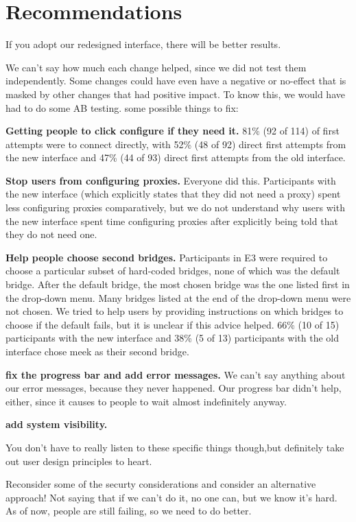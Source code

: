 \documentclass[USenglish,oneside,twocolumn]{article}
\begin{document}
\section{Recommendations}
\label{recommendations}
{\color {blue}
If you adopt our redesigned interface, there will be better results. 

We can't say how much each change helped, since we did not test them independently. Some changes could have even have a negative or no-effect that is masked by other changes that had positive impact. To know this, we would have had to do some AB testing. some possible things to fix: 

\begin{description}
\item {\bfseries Getting people to click configure if they need it.}  81\% (92 of 114) of first attempts were to connect directly, with 52\% (48 of 92) direct first attempts from the new interface and 47\% (44 of 93) direct first attempts from the old interface.  %
\item {\bfseries Stop users from configuring proxies.} Everyone did this. Participants with the new interface (which explicitly states that they did not need a proxy) spent less configuring proxies comparatively, but we do not understand why users with the new interface spent time configuring proxies after explicitly being told that they do not need one. %
\item {\bfseries Help people choose second bridges.}
Participants in E3 were required to choose a particular subset of hard-coded bridges, none of which was the default bridge. After the default bridge, the most chosen bridge was the one listed first in the drop-down menu. Many bridges listed at the end of the drop-down menu were not chosen. We tried to help users by providing instructions on which bridges to choose if the default fails, but it is unclear if this advice helped. 66\% (10 of 15) participants with the new interface and 38\% (5 of 13) participants with the old interface chose meek as their second bridge. %
\item {\bfseries fix the progress bar and add error messages.} 
We can't say anything about our error messages, because they never happened. Our progress bar didn't help, either, since it causes to people to wait almost indefinitely anyway. 
\item {\bfseries add system visibility.} 
\end{description}

You don't have to really listen to these specific things though,but definitely take out user design principles to heart. 

Reconsider some of the securty considerations and consider an alternative approach! Not saying that if we can't do it, no one can, but we know it's hard. As of now, people are still failing, so we need to do better. 
}
\end{document}
